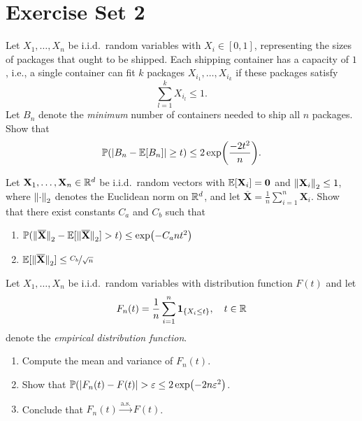 \section{Exercise Set 2}

\begin{exercise}
Let $X_1, \dots, X_n$ be i.i.d.\ random variables with $X_i \in [0,1]$, representing the sizes of packages that ought to be shipped. Each shipping container has a capacity of $1$, i.e., a single container can fit $k$ packages $X_{i_1}, \dots, X_{i_k}$ if these packages satisfy
\[
    \sum_{l=1}^k X_{i_l} \leq 1.
\]
Let $B_n$ denote the \emph{minimum} number of containers needed to ship all $n$ packages. Show that
\[
    \operatorname{\mathbb{P}}(\abs{B_n - \operatorname{\mathbb{E}}[B_n]} \geq t) \leq 2 \exp(\frac{-2t^2}{n}).
\]
\end{exercise}


\begin{exercise}
Let $\mathbf{X}_1, \dots, \mathbf{X}_n \in \mathbb{R}^d$ be i.i.d.\ random vectors with $\operatorname{\mathbb{E}}[\mathbf{X}_i] = \mathbf{0}$ and $\norm{\mathbf{X}_i}_2 \leq 1$, where $\norm{\cdot}_2$ denotes the Euclidean norm on $\mathbb{R}^d$, and let $\overline{\mathbf{X}} = \frac{1}{n} \sum_{i=1}^n \mathbf{X}_i$. Show that there exist constants $C_a$ and $C_b$ such that
\begin{enumerate}
    \item $\Prob(\norm*{\overline{\mathbf{X}}}_2 - \Exp[\norm*{\overline{\mathbf{X}}}_2] > t) \leq \exp(-C_a n t^2)$

    \item $\Exp[\norm*{\overline{\mathbf{X}}}_2] \leq \nicefrac{C_b}{\sqrt{n}}$
\end{enumerate}
\end{exercise}


\begin{exercise}
Let $X_1, \dots, X_n$ be i.i.d.\ random variables with distribution function $F(t)$ and let
\[
    F_n(t) = \frac{1}{n} \sum_{i=1}^n \indSet{X_i \leq t}, \quad t \in \R
\]
denote the \emph{empirical distribution function}.
\begin{enumerate}
    \item Compute the mean and variance of $F_n(t)$.

    \item Show that $\operatorname{\mathbb{P}}(\abs{F_n(t) - F(t)} > \varepsilon \leq 2 \exp(-2 n \varepsilon^2)$.

    \item Conclude that $F_n(t) \xrightarrow{\mathrm{a.s.}} F(t)$.
\end{enumerate}
\end{exercise}
